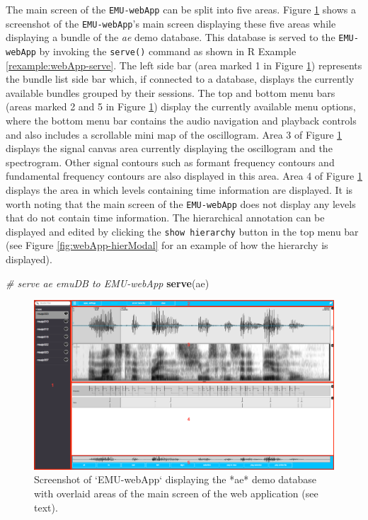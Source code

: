 \documentclass[]{book}
\newenvironment{Shaded}{\begin{snugshade}}{\end{snugshade}}
\newcommand{\CommentTok}[1]{\textcolor[rgb]{0.56,0.35,0.01}{\textit{#1}}}
\newcommand{\KeywordTok}[1]{\textcolor[rgb]{0.13,0.29,0.53}{\textbf{#1}}}
\newcommand{\NormalTok}[1]{#1}
\theoremstyle{definition}
\theoremstyle{definition}
\theoremstyle{definition}
\theoremstyle{remark}
\begin{document}
The main screen of the \texttt{EMU-webApp} can be split into five areas.
Figure \ref{fig:emu-web-emuWebAppLayout} shows a screenshot of the
\texttt{EMU-webApp}'s main screen displaying these five areas while
displaying a bundle of the \emph{ae} demo database. This database is
served to the \texttt{EMU-webApp} by invoking the \texttt{serve()}
command as shown in R Example \ref{rexample:webApp-serve}. The left side
bar (area marked 1 in Figure \ref{fig:emu-web-emuWebAppLayout})
represents the bundle list side bar which, if connected to a database,
displays the currently available bundles grouped by their sessions. The
top and bottom menu bars (areas marked 2 and 5 in Figure
\ref{fig:emu-web-emuWebAppLayout}) display the currently available menu
options, where the bottom menu bar contains the audio navigation and
playback controls and also includes a scrollable mini map of the
oscillogram. Area 3 of Figure \ref{fig:emu-web-emuWebAppLayout} displays
the signal canvas area currently displaying the oscillogram and the
spectrogram. Other signal contours such as formant frequency contours
and fundamental frequency contours are also displayed in this area. Area
4 of Figure \ref{fig:emu-web-emuWebAppLayout} displays the area in which
levels containing time information are displayed. It is worth noting
that the main screen of the \texttt{EMU-webApp} does not display any
levels that do not contain time information. The hierarchical annotation
can be displayed and edited by clicking the \texttt{show\ hierarchy}
button in the top menu bar (see Figure \ref{fig:webApp-hierModal} for an
example of how the hierarchy is displayed).

\begin{Shaded}
\begin{Highlighting}[]
\CommentTok{# serve ae emuDB to EMU-webApp}
\KeywordTok{serve}\NormalTok{(ae)}
\end{Highlighting}
\end{Shaded}

\begin{figure}

{\centering \includegraphics[width=1\linewidth]{pics/emu-webAppLayout} 

}

\caption{Screenshot of `EMU-webApp` displaying the *ae* demo database with overlaid areas of the main screen of the web application (see text).}\label{fig:emu-web-emuWebAppLayout}
\end{figure}
\end{document}
